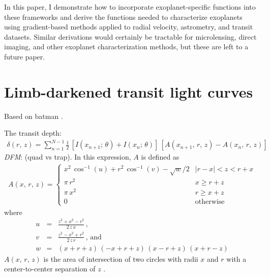 \documentclass[modern]{aastex62}
\newcommand{\project}[1]{\textsf{#1}}
\newcommand{\todo}[3]{{\color{#2}\emph{#1}: #3}}
\newcommand{\dfmtodo}[1]{\todo{DFM}{red}{#1}}
\begin{document}
In this paper, I demonstrate how to incorporate exoplanet-specific functions
into these frameworks and derive the functions needed to characterize
exoplanets using gradient-based methods applied to radial velocity,
astrometry, and transit datasets.
Similar derivations would certainly be tractable for microlensing, direct
imaging, and other exoplanet characterization methods, but these are left to a
future paper.

\section{Limb-darkened transit light curves}

Based on \project{batman} \citep{Kreidberg:2015}.

The transit depth:
\begin{eqnarray}
\delta(r,\,z) = \sum_{n=1}^{N-1} \frac{1}{2}\,\left[I(x_{n+1};\,\theta) +
I(x_n;\,\theta)\right]\,
\left[A(x_{n+1},\,r,\,z) - A(x_n,\,r,\,z)\right]
\end{eqnarray}
\dfmtodo{(quad vs trap)}.
In this expression, $A$ is defined as
\begin{eqnarray}
A(x,\,r,\,z) = \left\{\begin{array}{ll}
x^2\,\cos^{-1}(u)+r^2\,\cos^{-1}(v)-\sqrt{w}/2 &
    \left|r-x\right| < z < r + x \\
\pi\,r^2 & x \ge r + z \\
\pi\,x^2 & r \ge x + z \\
0 & \mathrm{otherwise}
\end{array}\right.
\end{eqnarray}
where
\begin{eqnarray}
u &=& \frac{z^2+x^2-r^2}{2\,z\,x} \,,\\
v &=& \frac{z^2-x^2+r^2}{2\,z\,r} \,,\,\mathrm{and}\\
w &=& (x+r+z)\,(-x+r+z)\,(x-r+z)\,(x+r-z)
\end{eqnarray}
$A(x,\,r,\,z)$ is the area of intersection of two circles with radii $x$ and
$r$ with a center-to-center separation of $z$ \citep{Mandel:2002,
Kreidberg:2015}.
\end{document}
